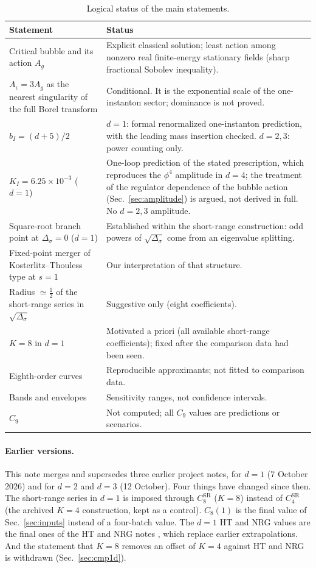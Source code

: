 \documentclass[11pt,a4paper]{article}
\numberwithin{equation}{section}
\newcommand{\Ds}{\Delta_\sigma}
\newcommand{\Ae}{A_\epsilon}
\newcommand{\Ag}{A_g}
\newcommand{\CSR}{C^{\mathrm{SR}}}
\newcommand{\sci}[2]{#1\times10^{#2}}
\begin{document}
\begin{table}[htbp]\centering\small
\renewcommand{\arraystretch}{1.2}
\begin{tabular}{@{}>{\raggedright\arraybackslash}p{}>{\raggedright\arraybackslash}p{}@{}}
\toprule
Statement & Status\\ \midrule
Critical bubble and its action $\Ag$ & Explicit classical solution; least action among nonzero real finite-energy stationary fields (sharp fractional Sobolev inequality).\\
$\Ae=3\Ag$ as the nearest singularity of the full Borel transform & Conditional. It is the exponential scale of the one-instanton sector; dominance is not proved.\\
$b_I=(d+5)/2$ & $d=1$: formal renormalized one-instanton prediction, with the leading mass insertion checked. $d=2,3$: power counting only.\\
$K_I=\sci{6.25}{-3}$ ($d=1$) & One-loop prediction of the stated prescription, which reproduces the $\phi^4$ amplitude in $d=4$; the treatment of the regulator dependence of the bubble action (Sec.~\ref{sec:amplitude}) is argued, not derived in full. No $d=2,3$ amplitude.\\
Square-root branch point at $\Ds=0$ ($d=1$) & Established within the short-range construction: odd powers of $\sqrt{\Ds}$ come from an eigenvalue splitting.\\
Fixed-point merger of Kosterlitz--Thouless type at $s=1$ & Our interpretation of that structure.\\
Radius $\simeq\frac12$ of the short-range series in $\sqrt{\Ds}$ & Suggestive only (eight coefficients).\\
$K=8$ in $d=1$ & Motivated a priori (all available short-range coefficients); fixed after the comparison data had been seen.\\
Eighth-order curves & Reproducible approximants; not fitted to comparison data.\\
Bands and envelopes & Sensitivity ranges, not confidence intervals.\\
$C_9$ & Not computed; all $C_9$ values are predictions or scenarios.\\
\bottomrule
\end{tabular}
\caption{Logical status of the main statements.}
\label{tab:status}
\end{table}

\paragraph{Earlier versions.} This note merges and supersedes three earlier project notes,
for $d=1$ (7 October 2026) and for $d=2$ and $d=3$ (12 October). Four things have changed
since then. The short-range series in $d=1$ is imposed through $\CSR_8$ ($K=8$) instead of
$\CSR_4$ (the archived $K=4$ construction, kept as a control). $C_8(1)$ is the final value of
Sec.~\ref{sec:inputs} instead of a four-batch value. The $d=1$ HT and NRG values are the final
ones of the HT and NRG notes \cite{noteHT,noteNRG}, which replace earlier extrapolations.
And the statement that $K=8$ removes an offset of $K=4$ against HT and NRG is withdrawn
(Sec.~\ref{sec:cmp1d}).
\end{document}
